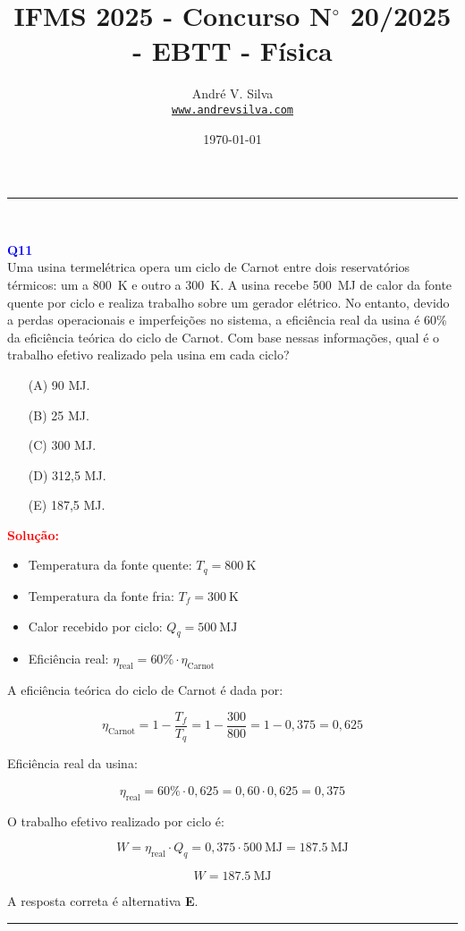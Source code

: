 \documentclass[a4paper,12pt]{article}
\title{ \textbf{\large IFMS 2025 - Concurso N$^{\circ}$ 20/2025 - EBTT - F\'isica}}
\author{Andr\'e V. Silva \\ \texttt{\url{www.andrevsilva.com}}}
\date{\today}
\begin{document}
\maketitle
\noindent\rule{\linewidth}{0.4pt}\\

\justifying

\begin{flushleft}
\textbf{\textcolor{blue}{\Large Q11}}\\
\noindent
Uma usina termelétrica opera um ciclo de Carnot entre dois reservatórios térmicos: um a 
\SI{800}{\kelvin} e outro a \SI{300}{\kelvin}. A usina recebe \SI{500}{\mega\joule} de calor da 
fonte quente por ciclo e realiza trabalho sobre um gerador elétrico. No entanto, devido a perdas 
operacionais e imperfeições no sistema, a eficiência real da usina é 60\% da eficiência teórica do ciclo 
de Carnot. Com base nessas informações, qual é o trabalho efetivo realizado pela usina em cada ciclo?

\begin{itemize}
\item[(A)] 90 MJ.
\item[(B)] 25 MJ.
\item[(C)] 300 MJ.
\item[(D)] 312,5 MJ.
\item[(E)] 187,5 MJ.
\end{itemize}

\vspace{0.5cm}

\textcolor{red}{\textbf{Solução:}}\\

\begin{itemize}
    \item Temperatura da fonte quente: \( T_q = \SI{800}{\kelvin} \)
    \item Temperatura da fonte fria: \( T_f = \SI{300}{\kelvin} \)
    \item Calor recebido por ciclo: \( Q_q = \SI{500}{\mega\joule} \)
    \item Eficiência real: \( \eta_{\text{real}} = 60\% \cdot \eta_{\text{Carnot}} \)
\end{itemize}

\vspace{1em}
A eficiência teórica do ciclo de Carnot é dada por:

\[
\eta_{\text{Carnot}} = 1 - \frac{T_f}{T_q} = 1 - \frac{300}{800} = 1 - 0{,}375 = 0{,}625
\]

Eficiência real da usina:

\[
\eta_{\text{real}} = 60\% \cdot 0{,}625 = 0{,}60 \cdot 0{,}625 = 0{,}375
\]

O trabalho efetivo realizado por ciclo é:

\[
W = \eta_{\text{real}} \cdot Q_q = 0{,}375 \cdot \SI{500}{\mega\joule} = \SI{187.5}{\mega\joule}
\]

\[
\boxed{W = \SI{187.5}{\mega\joule}}
\]

A resposta correta é alternativa \colorbox{green!50}{\textbf{E}}.

\end{flushleft}
\noindent\rule{\linewidth}{0.6pt}\\
\end{document}
